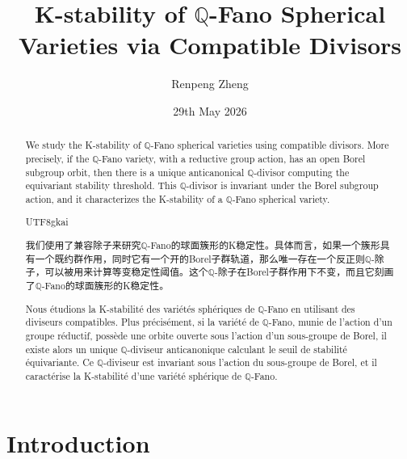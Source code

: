 \documentclass[11pt, oneside]{amsart}
\author{Renpeng Zheng}
\title{K-stability of $\mathbb{Q}$-Fano Spherical Varieties via Compatible Divisors}
\date{29th May 2026}
\newenvironment{abstractZH}{
  \begin{otherlanguage}{chinese}
    \begin{abstract}
      \begin{CJK*}{UTF8}{gkai}
}{
      \end{CJK*}
    \end{abstract}
  \end{otherlanguage}
}
\newcommand{\<}{\left\langle} \renewcommand{\>}{\right\rangle}
\let\origmaketitle\maketitle
\def\maketitle{
  \begingroup
  \def\uppercasenonmath##1{} %
  \let\MakeUppercase\relax %
  \origmaketitle
  \endgroup
  \vspace{-0.6cm}
}
\newcommand{\nocontentsline}[3]{}
\newcommand\stoptoc{\let\addcontentsline\nocontentsline}
\begin{document}
\maketitle

\begin{abstract}
  We study the K-stability of $\mathbb{Q}$-Fano spherical varieties using compatible divisors. More precisely, if the $\mathbb{Q}$-Fano variety, with a reductive group action, has an open Borel subgroup orbit, then there is a unique anticanonical $\mathbb{Q}$-divisor computing the equivariant stability threshold. This $\mathbb{Q}$-divisor is invariant under the Borel subgroup action, and it characterizes the K-stability of a $\mathbb{Q}$-Fano spherical variety.
\end{abstract}
\begin{abstractZH}
  我们使用了兼容除子来研究$\mathbb{Q}$-Fano的球面簇形的K稳定性。具体而言，如果一个簇形具有一个既约群作用，同时它有一个开的Borel子群轨道，那么唯一存在一个反正则$\mathbb{Q}$-除子，可以被用来计算等变稳定性阈值。这个$\mathbb{Q}$-除子在Borel子群作用下不变，而且它刻画了$\mathbb{Q}$-Fano的球面簇形的K稳定性。
\end{abstractZH}
\begin{otherlanguage}{french}
\begin{abstract}
  Nous étudions la K-stabilité des variétés sphériques de $\mathbb{Q}$-Fano en utilisant des diviseurs compatibles. Plus précisément, si la variété de $\mathbb{Q}$-Fano, munie de l'action d'un groupe réductif, possède une orbite ouverte sous l'action d'un sous-groupe de Borel, il existe alors un unique $\mathbb{Q}$-diviseur anticanonique calculant le seuil de stabilité équivariante. Ce $\mathbb{Q}$-diviseur est invariant sous l'action du sous-groupe de Borel, et il caractérise la K-stabilité d'une variété sphérique de $\mathbb{Q}$-Fano.
\end{abstract}
\end{otherlanguage}

\tableofcontents

\section*{Introduction}\label{sec:intro}
\begingroup
  \renewcommand{\thetheorem}{(\Alph{theorem})}
  \stoptoc
  
\newcommand{\ord}{\mathrm{ord}}

\newcommand{\GDValo}{\mathrm{DivVal}^{G, \circ}}
\newcommand{\cano}{\mathrm{K}}
\end{document}
